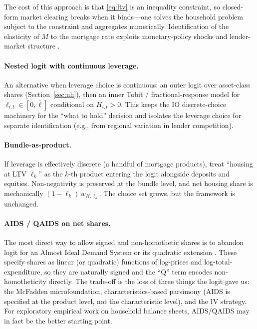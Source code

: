 \documentclass[11pt,a4paper]{article}
\begin{document}
The cost of this approach is that \eqref{eq:ltv} is an inequality
constraint, so closed-form market clearing breaks when it binds---one
solves the household problem subject to the constraint and aggregates
numerically. Identification of the elasticity of $M$ to the mortgage
rate exploits monetary-policy shocks and lender-market structure
\citep{greenwald2018mortgage,kaplan2020housing}.

\paragraph{Nested logit with continuous leverage.}
An alternative when leverage choice is continuous: an outer logit over
asset-class shares (Section~\ref{sec:nh}), then an inner Tobit /
fractional-response model for $\ell_{i,t}\in[0,\bar\ell]$ conditional
on $H_{i,t}>0$. This keeps the IO discrete-choice machinery for the
``what to hold'' decision and isolates the leverage choice for separate
identification (e.g., from regional variation in lender competition).

\paragraph{Bundle-as-product.}
If leverage is effectively discrete (a handful of mortgage products),
treat ``housing at LTV $\ell_k$'' as the $k$-th product entering the
logit alongside deposits and equities. Non-negativity is preserved at
the bundle level, and net housing share is mechanically
$(1-\ell_k)\,w_{H,\ell_k}$. The choice set grows, but the framework is
unchanged.

\paragraph{AIDS / QAIDS on net shares.}
The most direct way to allow signed and non-homothetic shares is to
abandon logit for an Almost Ideal Demand System
\citep{deaton1980almost} or its quadratic extension
\citep{banks1997quadratic}. These specify shares as linear (or
quadratic) functions of log-prices and log-total-expenditure, so they
are naturally signed and the ``Q'' term encodes non-homotheticity
directly. The trade-off is the loss of three things the logit gave us:
the McFadden microfoundation, characteristics-based parsimony (AIDS is
specified at the product level, not the characteristic level), and the
\citet{koijen2019demand} IV strategy. For exploratory empirical work on
household balance sheets, AIDS/QAIDS may in fact be the better starting
point.
\end{document}
